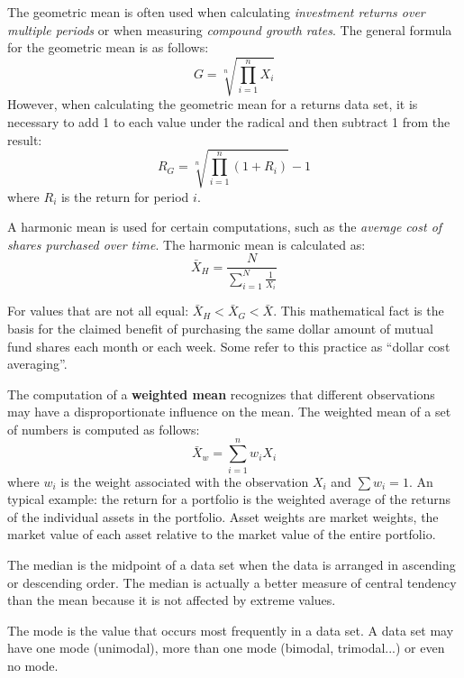 The geometric mean is often used when calculating \textit{investment returns over multiple periods} or when measuring \textit{compound growth rates}. The general formula for the geometric mean is as follows:
\begin{equation}
	G = \sqrt[n]{\prod_{i=1}^n X_i}
\end{equation}
However, when calculating the geometric mean for a returns data set, it is necessary to add 1 to each value under the radical and then subtract 1 from the result:
\begin{equation}
	R_G = \sqrt[n]{\prod_{i=1}^n \left( 1 + R_i \right)} - 1
\end{equation}
where $R_i$ is the return for period $i$.

A harmonic mean is used for certain computations, such as the \textit{average cost of shares purchased over time}. The harmonic mean is calculated as:
\begin{equation}
	\bar{X}_H = \frac{N}{\sum_{i=1}^N \frac{1}{X_i}}
\end{equation}

For values that are not all equal: $\bar{X}_H < \bar{X}_G < \bar{X}$. This mathematical fact is the basis for the claimed benefit of purchasing the same dollar amount of mutual fund shares each month or each week. Some refer to this practice as ``dollar cost averaging''.

The computation of a \textbf{weighted mean} recognizes that different observations may have a disproportionate influence on the mean. The weighted mean of a set of numbers is computed as follows:
\begin{equation}
	\bar{X}_w = \sum_{i=1}^n w_i X_i
\end{equation}
where $w_i$ is the weight associated with the observation $X_i$ and $\sum w_i = 1$.
An typical example: the return for a portfolio is the weighted average of the returns of the individual assets in the portfolio. Asset weights are market weights, the market value of each asset relative to the market value of the entire portfolio.

The median is the midpoint of a data set when the data is arranged in ascending or descending order. The median is actually a better measure of central tendency than the mean because it is not affected by extreme values.

The mode is the value that occurs most frequently in a data set. A data set may have one mode (unimodal), more than one mode (bimodal, trimodal...) or even no mode.



